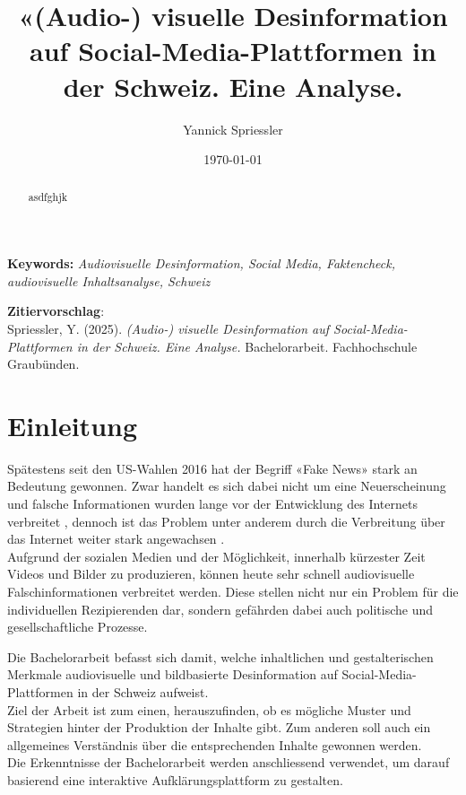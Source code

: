 \documentclass[12pt,a4paper]{article}        %
\title{«(Audio-) visuelle Desinformation auf Social-Media-Plattformen in der Schweiz. Eine Analyse.}        %
\author{Yannick Spriessler}     %
\date{\today}     %
\begin{document}
\begin{titlingpage} %
  
  \nocite{howard_trees_2017}  %
\end{titlingpage}
\pagebreak      %
\renewcommand{\abstractname}{Abstract}
\begin{abstract}
  \setlength{\parindent}{0pt}
  asdfghjk
\end{abstract}

\textbf{Keywords:} \textit{Audiovisuelle Desinformation, Social Media, Faktencheck, audiovisuelle Inhaltsanalyse, Schweiz}

\textbf{Zitiervorschlag}:\\
Spriessler, Y. (2025). \textit{(Audio-) visuelle Desinformation auf Social-Media-Plattformen in der Schweiz. Eine Analyse.} Bachelorarbeit. Fachhochschule Graubünden.

\pagebreak
\thispagestyle{empty}
\setcounter{page}{0}    %
\tableofcontents        %
\pagebreak

\section{Einleitung}
Spätestens seit den US-Wahlen 2016 hat der Begriff «Fake News» stark an Bedeutung gewonnen. Zwar handelt es sich dabei nicht um eine Neuerscheinung und falsche Informationen wurden lange vor der Entwicklung des Internets verbreitet \parencites[214]{allcott_social_2017}[247]{hohlfeld_schlechte_2020}[1]{khan_fake_2021}, dennoch ist das Problem unter anderem durch die Verbreitung über das Internet weiter stark angewachsen \parencites[214–215]{allcott_social_2017}[1]{khan_fake_2021}[1]{lazer_science_2018}[4]{ceron_fake_2021}.\\
Aufgrund der sozialen Medien und der Möglichkeit, innerhalb kürzester Zeit Videos und Bilder zu produzieren, können heute sehr schnell audiovisuelle Falschinformationen verbreitet werden. Diese stellen nicht nur ein Problem für die individuellen Rezipierenden dar, sondern gefährden dabei auch politische und gesellschaftliche Prozesse.

Die Bachelorarbeit befasst sich damit, welche inhaltlichen und gestalterischen Merkmale audiovisuelle und bildbasierte Desinformation auf Social-Media-Plattformen in der Schweiz aufweist. \\
Ziel der Arbeit ist zum einen, herauszufinden, ob es mögliche Muster und Strategien hinter der Produktion der Inhalte gibt. Zum anderen soll auch ein allgemeines Verständnis über die entsprechenden Inhalte gewonnen werden. \\
Die Erkenntnisse der Bachelorarbeit werden anschliessend verwendet, um darauf basierend eine interaktive Aufklärungsplattform zu gestalten.
\end{document}
